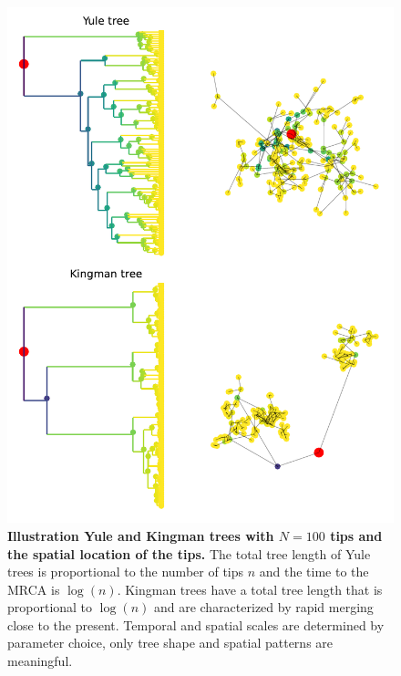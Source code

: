 \documentclass[aps,rmp, twocolumn]{revtex4}
\begin{document}
\begin{figure}[tb]
    \includegraphics*[width=\columnwidth]{figures/illustration_tree.pdf}
    \caption{\label{fig:illustration_tree}{\bf Illustration Yule and Kingman trees with $N=100$ tips and the spatial location of the tips.}
    The total tree length of Yule trees is proportional to the number of tips $n$ and the time to the MRCA is $\log(n)$.
    Kingman trees have a total tree length that is proportional to $\log(n)$ and are characterized by rapid merging close to the present.
    Temporal and spatial scales are determined by parameter choice, only tree shape and spatial patterns are meaningful. }
\end{figure}
\end{document}
